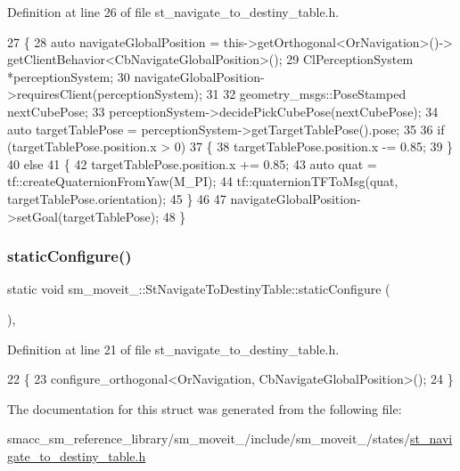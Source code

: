 Definition at line 26 of file st\+\_\+navigate\+\_\+to\+\_\+destiny\+\_\+table.\+h.


\begin{DoxyCode}
27         \{
28             \textcolor{keyword}{auto} navigateGlobalPosition = this->getOrthogonal<OrNavigation>()->
      getClientBehavior<CbNavigateGlobalPosition>();
29             ClPerceptionSystem *perceptionSystem;
30             navigateGlobalPosition->requiresClient(perceptionSystem);
31 
32             geometry\_msgs::PoseStamped nextCubePose;
33             perceptionSystem->decidePickCubePose(nextCubePose);
34             \textcolor{keyword}{auto} targetTablePose = perceptionSystem->getTargetTablePose().pose;
35 
36             \textcolor{keywordflow}{if} (targetTablePose.position.x > 0)
37             \{
38                 targetTablePose.position.x -= 0.85;   
39             \}
40             \textcolor{keywordflow}{else}
41             \{
42                 targetTablePose.position.x += 0.85;
43                 \textcolor{keyword}{auto} quat = tf::createQuaternionFromYaw(M\_PI);
44                 tf::quaternionTFToMsg(quat, targetTablePose.orientation);
45             \}
46 
47             navigateGlobalPosition->setGoal(targetTablePose);
48         \}
\end{DoxyCode}
\mbox{\label{structsm__moveit__4_1_1StNavigateToDestinyTable_a2a53aaa5ef99206441170e41e59462e9}} 
\subsubsection{\texorpdfstring{static\+Configure()}{staticConfigure()}}
{\footnotesize\ttfamily static void sm\+\_\+moveit\+\_\+::\+St\+Navigate\+To\+Destiny\+Table\+::static\+Configure (\begin{DoxyParamCaption}{ }\end{DoxyParamCaption})\hspace{0.3cm}{\ttfamily [inline]}, {\ttfamily [static]}}



Definition at line 21 of file st\+\_\+navigate\+\_\+to\+\_\+destiny\+\_\+table.\+h.


\begin{DoxyCode}
22         \{
23             configure\_orthogonal<OrNavigation, CbNavigateGlobalPosition>();
24         \}
\end{DoxyCode}


The documentation for this struct was generated from the following file\+:\begin{DoxyCompactItemize}
\item 
smacc\+\_\+sm\+\_\+reference\+\_\+library/sm\+\_\+moveit\+\_/include/sm\+\_\+moveit\+\_/states/\hyperlink{st__navigate__to__destiny__table_8h}{st\+\_\+navigate\+\_\+to\+\_\+destiny\+\_\+table.\+h}\end{DoxyCompactItemize}
